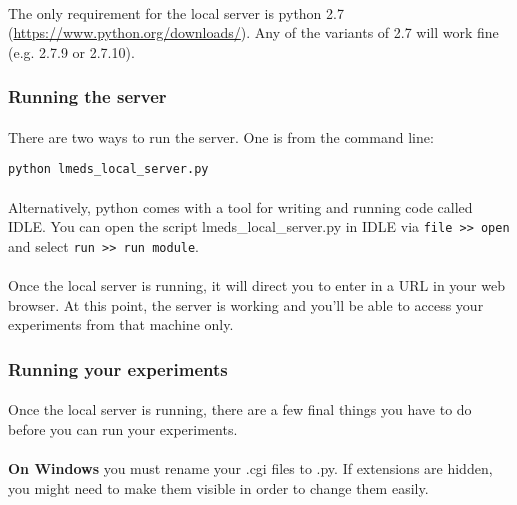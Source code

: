 \paragraph{}
The only requirement for the local server is python 2.7 (\url{https://www.python.org/downloads/}).  Any of the variants of 2.7 will work fine (e.g. 2.7.9 or 2.7.10).

\subsubsection{Running the server}

\paragraph{}
There are two ways to run the server.  One is from the command line:

\begin{lstlisting}
python lmeds_local_server.py
\end{lstlisting}

\paragraph{}
Alternatively, python comes with a tool for writing and running code called IDLE.  You can open the script lmeds\_local\_server.py in IDLE via \texttt{file >> open} and select \texttt{run >> run module}.

\paragraph{}
Once the local server is running, it will direct you to enter in a URL in your web browser.  At this point, the server is working and you'll be able to access your experiments from that machine only.

\subsubsection{Running your experiments}

\paragraph{}
Once the local server is running, there are a few final things you have to do before you can run your experiments.

\paragraph{}
\begin{tcolorbox}[breakable,colback=white,colframe=blue,width=\dimexpr\textwidth+12mm\relax,enlarge left by=-6mm,enlarge right by=6mm]
\textbf{On Windows} you must rename your .cgi files to .py.  If extensions are hidden, you might need to make them visible in order to change them easily.
\end{tcolorbox}

